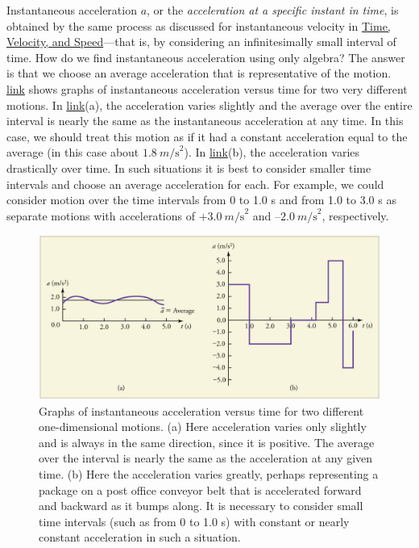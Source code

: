\documentclass[
]{book}
\begin{document}
\protect\hypertarget{import-auto-id2303194}{}{Instantaneous acceleration}
\(a{}\), or the \emph{acceleration at a specific instant in time}, is obtained
by the same process as discussed for instantaneous velocity in \href{/m54771}{Time,
Velocity, and Speed}---that is, by considering an
infinitesimally small interval of time. How do we find instantaneous
acceleration using only algebra? The answer is that we choose an average
acceleration that is representative of the motion.
\protect\hyperlink{import-auto-id2590846}{link} shows graphs of
instantaneous acceleration versus time for two very different motions.
In \protect\hyperlink{import-auto-id2590846}{link}(a), the
acceleration varies slightly and the average over the entire interval is
nearly the same as the instantaneous acceleration at any time. In this
case, we should treat this motion as if it had a constant acceleration
equal to the average (in this case about
\({1\text{.}8\ m\text{/s}^{2}}{}\)). In
\protect\hyperlink{import-auto-id2590846}{link}(b), the
acceleration varies drastically over time. In such situations it is best
to consider smaller time intervals and choose an average acceleration
for each. For example, we could consider motion over the time intervals
from 0 to 1.0 s and from 1.0 to 3.0 s as separate motions with
accelerations of \({+ 3}\text{.}0\ m\text{/s}^{2}\) and
\(\text{–2}\text{.}0\ m\text{/s}^{2}\), respectively.

\begin{figure}
\hypertarget{import-auto-id2590846}{%
\centering
\includegraphics{images/Figure_02_03_02.jpg}
\caption{Graphs of instantaneous acceleration versus time for two different
one-dimensional motions. (a) Here acceleration varies only slightly and
is always in the same direction, since it is positive. The average over
the interval is nearly the same as the acceleration at any given time.
(b) Here the acceleration varies greatly, perhaps representing a package
on a post office conveyor belt that is accelerated forward and backward
as it bumps along. It is necessary to consider small time intervals
(such as from 0 to 1.0 s) with constant or nearly constant acceleration
in such a
situation.}\label{import-auto-id2590846}
}
\end{figure}
\end{document}
